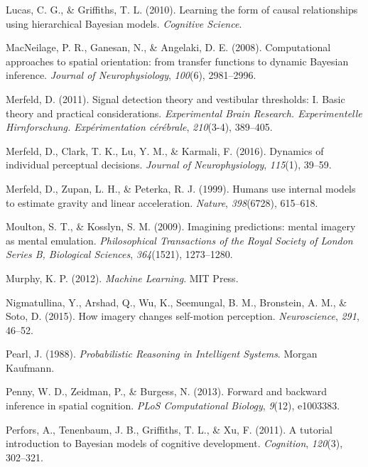 \documentclass[english,floatsintext,man]{apa6}
\theoremstyle{definition}
\theoremstyle{definition}
\theoremstyle{remark}
\begin{document}
\hypertarget{ref-Lucas:2010tu}{}
Lucas, C. G., \& Griffiths, T. L. (2010). Learning the form of causal
relationships using hierarchical Bayesian models. \emph{Cognitive
Science}.

\hypertarget{ref-PaulRMacNeilage:2008bv}{}
MacNeilage, P. R., Ganesan, N., \& Angelaki, D. E. (2008). Computational
approaches to spatial orientation: from transfer functions to dynamic
Bayesian inference. \emph{Journal of Neurophysiology}, \emph{100}(6),
2981--2996.

\hypertarget{ref-Merfeld:2011fs}{}
Merfeld, D. (2011). Signal detection theory and vestibular thresholds:
I. Basic theory and practical considerations. \emph{Experimental Brain
Research. Experimentelle Hirnforschung. Expérimentation cérébrale},
\emph{210}(3-4), 389--405.

\hypertarget{ref-Merfeld:2016il}{}
Merfeld, D., Clark, T. K., Lu, Y. M., \& Karmali, F. (2016). Dynamics of
individual perceptual decisions. \emph{Journal of Neurophysiology},
\emph{115}(1), 39--59.

\hypertarget{ref-Merfeld:1999cg}{}
Merfeld, D., Zupan, L. H., \& Peterka, R. J. (1999). Humans use internal
models to estimate gravity and linear acceleration. \emph{Nature},
\emph{398}(6728), 615--618.

\hypertarget{ref-Moulton:2009ij}{}
Moulton, S. T., \& Kosslyn, S. M. (2009). Imagining predictions: mental
imagery as mental emulation. \emph{Philosophical Transactions of the
Royal Society of London Series B, Biological Sciences},
\emph{364}(1521), 1273--1280.

\hypertarget{ref-Murphy:2012ua}{}
Murphy, K. P. (2012). \emph{Machine Learning}. MIT Press.

\hypertarget{ref-Nigmatullina:2015gh}{}
Nigmatullina, Y., Arshad, Q., Wu, K., Seemungal, B. M., Bronstein, A.
M., \& Soto, D. (2015). How imagery changes self-motion perception.
\emph{Neuroscience}, \emph{291}, 46--52.

\hypertarget{ref-Pearl:1988wz}{}
Pearl, J. (1988). \emph{Probabilistic Reasoning in Intelligent Systems}.
Morgan Kaufmann.

\hypertarget{ref-Penny:2013iv}{}
Penny, W. D., Zeidman, P., \& Burgess, N. (2013). Forward and backward
inference in spatial cognition. \emph{PLoS Computational Biology},
\emph{9}(12), e1003383.

\hypertarget{ref-Perfors:2011ex}{}
Perfors, A., Tenenbaum, J. B., Griffiths, T. L., \& Xu, F. (2011). A
tutorial introduction to Bayesian models of cognitive development.
\emph{Cognition}, \emph{120}(3), 302--321.
\end{document}
